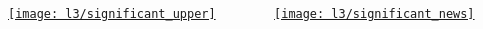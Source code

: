 \documentclass[mathserif, aspectratio=169]{beamer}
\begin{document}
\begin{frame}[plain]
	\begin{columns}
		\begin{column}{0.6\textwidth}
			\vspace{-3mm}
			\begin{center}
				\href{https://www.xkcd.com/882/}{\texttt{[image: l3/significant\_upper]}}
			\end{center}
		\end{column}
		\begin{column}{0.4\textwidth}
			\href{https://www.xkcd.com/882/}{\texttt{[image: l3/significant\_news]}}
		\end{column}
	\end{columns}
\end{frame}
\end{document}
